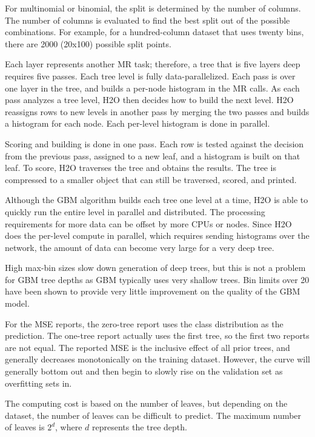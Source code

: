 \documentclass{article}[11pt]
\begin{document}
{For multinomial or binomial, the split is determined by the number of columns. The number of columns is evaluated to find the best split out of the possible combinations. For example, for a hundred-column dataset that uses twenty bins, there are 2000 (20x100) possible split points. 

Each layer represents another MR task; therefore, a tree that is five layers deep requires five passes. Each tree level is fully data-parallelized. Each pass is over one layer in the tree, and builds a per-node histogram in the MR calls. As each pass analyzes a tree level, H2O then decides how to build the next level. H2O reassigns rows to new levels in another pass by merging the two passes and builds a histogram for each node. Each per-level histogram is done in parallel. 

Scoring and building is done in one pass. Each row is tested against the decision from the previous pass, assigned to a new leaf, and a histogram is built on that leaf. To score, H2O traverses the tree and obtains the results. The tree is compressed to a smaller object that can still be traversed, scored, and printed. 

Although the GBM algorithm builds each tree one level at a time, H2O is able to quickly run the entire level in parallel and distributed. The processing requirements for more data can be offset by more CPUs or nodes.  Since H2O does the per-level compute in parallel, which requires sending histograms over the network, the amount of data can become very large for a very deep tree. 

High max-bin sizes slow down generation of deep trees, but this is not a problem for GBM tree depths as GBM typically uses very shallow trees. Bin limits over 20 have been shown to provide very little improvement on the quality of the GBM model. 

For the MSE reports, the zero-tree report uses the class distribution as the prediction. The one-tree report actually uses the first tree, so the first two reports are not equal. The reported MSE is the inclusive effect of all prior trees, and generally decreases monotonically on the training dataset. However, the curve will generally bottom out and then begin to slowly rise on the validation set as overfitting sets in. 

The computing cost is based on the number of leaves, but depending on the dataset, the number of leaves can be difficult to predict. The maximum number of leaves is $2^d$, where $d$ represents the tree depth.

}
\end{document}
